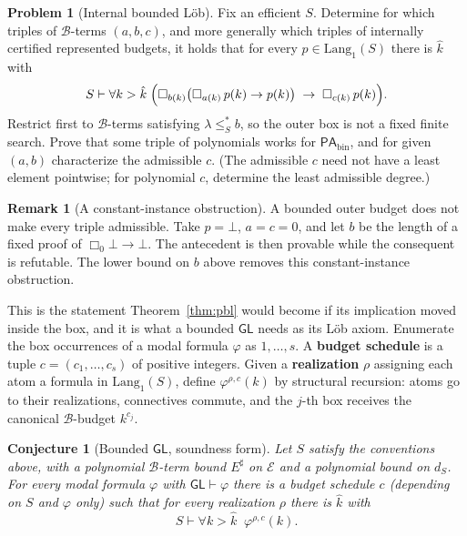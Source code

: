 \documentclass[11pt]{amsart}
\theoremstyle{plain}
\newtheorem{conjecture}[theorem]{Conjecture}
\theoremstyle{definition}
\newtheorem{problem}[theorem]{Problem}
\newtheorem{remark}[theorem]{Remark}
\newcommand{\PAbin}{\mathsf{PA}_{\mathrm{bin}}}
\newcommand{\GL}{\mathsf{GL}}
\newcommand{\Lang}{\mathrm{Lang}}
\newcommand{\Bud}{\mathcal{B}}
\newcommand{\leSstar}{\mathrel{\leq_S^{*}}}
\begin{document}
\begin{problem}[Internal bounded L\"ob]
\label{prob:internal}
Fix an efficient $S$. Determine for which triples of $\Bud$-terms $(a,b,c)$, and more generally which triples of internally certified represented budgets, it holds that for every $p\in\Lang_1(S)$ there is $\hat{k}$ with
\[
S \vdash \forall k > \hat{k}\;\Bigl(\Box_{b(k)}\bigl(\Box_{a(k)}\,p(k) \to p(k)\bigr) \;\to\; \Box_{c(k)}\,p(k)\Bigr).
\]
Restrict first to $\Bud$-terms satisfying $\lambda\leSstar b$, so the outer box is not a fixed finite search. Prove that some triple of polynomials works for $\PAbin$, and for given $(a,b)$ characterize the admissible $c$. (The admissible $c$ need not have a least element pointwise; for polynomial $c$, determine the least admissible degree.)
\end{problem}

\begin{remark}[A constant-instance obstruction]
A bounded outer budget does not make every triple admissible. Take $p=\bot$, $a=c=0$, and let $b$ be the length of a fixed proof of $\Box_0\bot\to\bot$. The antecedent is then provable while the consequent is refutable. The lower bound on $b$ above removes this constant-instance obstruction.
\end{remark}

This is the statement Theorem~\ref{thm:pbl} would become if its implication moved inside the box, and it is what a bounded $\GL$ needs as its L\"ob axiom. Enumerate the box occurrences of a modal formula $\varphi$ as $1,\dots,s$. A \textbf{budget schedule} is a tuple $c=(c_1,\dots,c_s)$ of positive integers. Given a \textbf{realization} $\rho$ assigning each atom a formula in $\Lang_1(S)$, define $\varphi^{\rho,c}(k)$ by structural recursion: atoms go to their realizations, connectives commute, and the $j$-th box receives the canonical $\Bud$-budget $k^{c_j}$.

\begin{conjecture}[Bounded $\GL$, soundness form]
\label{conj:boundedGL}
Let $S$ satisfy the conventions above, with a polynomial $\Bud$-term bound $E^\sharp$ on $\mathcal E$ and a polynomial bound on $d_S$. For every modal formula $\varphi$ with $\GL\vdash\varphi$ there is a budget schedule $c$ (depending on $S$ and $\varphi$ only) such that for every realization $\rho$ there is $\hat{k}$ with
\[
S \vdash \forall k > \hat{k}\;\; \varphi^{\rho,c}(k).
\]
\end{conjecture}
\end{document}
